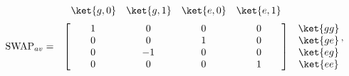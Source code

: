 \documentclass[a4paper,11pt]{article} %
\begin{document}
\begin{equation*} \label{ec_ions_SWAPav}
 \begin{matrix}
    & 
    \begin{matrix}
      \ket{g,0} & 
      \ket{g,1} & 
      \ket{e,0} &
      \ket{e,1}
    \end{matrix} 	&  \\[.5\normalbaselineskip]
    \text{SWAP}_{av} = & 
    \begin{bmatrix}
        \makebox[\widthof{$\ket{g,0}$}]{$1$} & 
        \makebox[\widthof{$\ket{g,0}$}]{$0$} & 
        \makebox[\widthof{$\ket{g,0}$}]{$0$} & 
        \makebox[\widthof{$\ket{g,0}$}]{$0$} \\
        \makebox[\widthof{$\ket{g,0}$}]{$0$} & 
        \makebox[\widthof{$\ket{g,0}$}]{$0$} & 
        \makebox[\widthof{$\ket{g,0}$}]{$1$} & 
        \makebox[\widthof{$\ket{g,0}$}]{$0$} \\
        \makebox[\widthof{$\ket{g,0}$}]{$0$} & 
        \makebox[\widthof{$\ket{g,0}$}]{$-1$} & 
        \makebox[\widthof{$\ket{g,0}$}]{$0$} & 
        \makebox[\widthof{$\ket{g,0}$}]{$0$} \\
        \makebox[\widthof{$\ket{g,0}$}]{$0$} & 
        \makebox[\widthof{$\ket{g,0}$}]{$0$} & 
        \makebox[\widthof{$\ket{g,0}$}]{$0$} & 
        \makebox[\widthof{$\ket{g,0}$}]{$1$} \\
    \end{bmatrix} &
    \begin{matrix} \ket{gg} \\ \ket{ge} \\ \ket{eg} \\ \ket{ee} \end{matrix} 
\end{matrix} \,,
\end{equation*}
\end{document}
